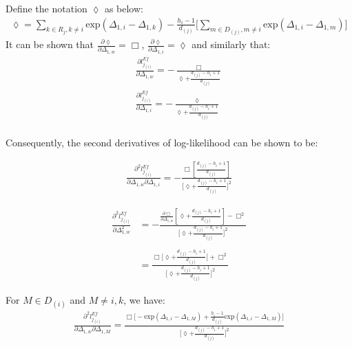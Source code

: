 \documentclass[]{article}
\begin{document}
Define the notation \(\lozenge\) as below:
\begin{equation}\begin{aligned}\label{eqn:DefEfron2}
\lozenge = \sum_{k\in R_j, k\neq i}\text{exp}(\Delta_{1,i}-\Delta_{1,k})-\frac{h_i-1}{d_{(j)}}\big[\sum_{m\in D_{(j)}, m\neq i}\text{exp}(\Delta_{1,i}-\Delta_{1,m})\big]
\end{aligned}\end{equation} It can be shown that
\(\frac{\partial\lozenge}{\partial \Delta_{1,w}}=\Box\),
\(\frac{\partial\lozenge}{\partial \Delta_{1,i}}=\lozenge\) and
similarly that: \begin{equation}\begin{aligned}\label{eqn:DefEfron2back}
\frac{\partial l_{j_{(i)}}^{Ef}}{\partial\Delta_{1,w}} = -\frac{\Box}{\lozenge+\frac{d_{(j)}-h_i+1}{d_{(j)}}} \\
\frac{\partial l_{j_{(i)}}^{Ef}}{\partial\Delta_{1,i}} = -\frac{\lozenge}{\lozenge+\frac{d_{(j)}-h_i+1}{d_{(j)}}} \\
\end{aligned}\end{equation}

Consequently, the second derivatives of log-likelihood can be shown to
be:

\begin{equation}\begin{aligned}\label{eqn:Efron8}
\frac{\partial^2 l_{j_{(i)}}^{Ef}}{\partial \Delta_{1,w} \partial \Delta_{1,i}} = -\frac{\Box[\frac{d_{(j)}-h_i+1}{d_{(j)}}]}{\bigg[\lozenge+\frac{d_{(j)}-h_i+1}{d_{(j)}}\bigg]^2}
\end{aligned}\end{equation}

\begin{equation}\begin{aligned}\label{eqn:Efron9}
\frac{\partial^2 l_{j_{(i)}}^{Ef}}{\partial \Delta_{1,w}^2} &= -\frac{\frac{\partial\Box}{\partial\Delta_{1,w}}[\lozenge+\frac{d_{(j)}-h_i+1}{d_{(j)}}]-\Box^2}{\bigg[\lozenge+\frac{d_{(j)}-h_i+1}{d_{(j)}}\bigg]^2} \\
\\
&= \frac{\Box \big[\lozenge + \frac{d_{(j)}-h_i+1}{d_{(j)}}\big]+\Box^2}{\bigg[\lozenge+\frac{d_{(j)}-h_i+1}{d_{(j)}}\bigg]^2}
\end{aligned}\end{equation}

For \(M \in D_{(i)}\) and \(M \neq i,k\), we have:
\begin{equation}\begin{aligned}\label{eqn:Efron10}
\frac{\partial^2 l_{j_{(i)}}^{Ef}}{\partial \Delta_{1,w} \partial \Delta_{1,M}} = \frac{\Box\bigg[-\text{exp}(\Delta_{1,i}-\Delta_{1,M})+\frac{h_i-1}{d_{(j)}}\text{exp}(\Delta_{1,i}-\Delta_{1,M})\bigg]}{\bigg[\lozenge+\frac{d_{(j)}-h_i+1}{d_{(j)}}\bigg]^2}
\end{aligned}\end{equation}
\end{document}
